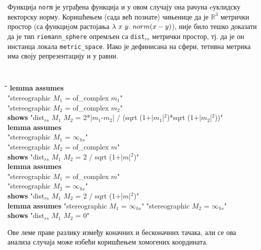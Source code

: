 Функција {\tt norm} је уграђена функција и у овом случају она рачуна
eуклидску векторску норму. Коришћењем (сада већ познате) чињенице да
је $\mathbb{R}^3$ метрички простор (са функциjом растојања
$\lambda\ x\ y.\ {\tt norm}(x - y)$), није било тешко доказати да је
тип {\tt riemann\_sphere} опремљен са {\tt dist$_{rs}$} метрички
простор, тј. да је он инстанца локала {\tt metric\_space}. Иако је
дефинисана на сфери, тетивна метрика има своју репрезентацију и у
равни.

{\tt
\begin{tabbing}
\hspace{2mm}\=\hspace{5mm}\=\hspace{5mm}\=\hspace{5mm}\=\hspace{5mm}\=\kill
\textbf{lemma} \textbf{assumes}\\
\>"stereographic $M_1$ = of\_complex $m_1$"\\
\>"stereographic $M_2$ = of\_complex $m_2$"\\
\>\textbf{shows} "dist$_{rs}$ $M_1$ $M_2$ = 2*|$m_1$-$m_2$| / (sqrt (1+|$m_1$|$^2$)*sqrt (1+|$m_2$|$^2$))"\\
\textbf{lemma} \textbf{assumes} \\
\>"stereographic $M_1$ = $\infty_{hs}$" \\
\>"stereographic $M_2$ = of\_complex $m$"\\
\>\textbf{shows} "dist$_{rs}$ $M_1$ $M_2$ = 2 / sqrt (1+|$m$|$^2$)"\\
\textbf{lemma} \textbf{assumes} \\
\>"stereographic $M_1$ = of\_complex $m$" \\
\>"stereographic $M_2$ = $\infty_{hs}$"\\
\>\textbf{shows} "dist$_{rs}$ $M_1$ $M_2$ = 2 / sqrt (1+|$m$|$^2$)"\\
\textbf{lemma} \textbf{assumes} "stereographic $M_1$ = $\infty_{hs}$" "stereographic $M_2$ = $\infty_{hs}$"\\
\>\textbf{shows} "dist$_{rs}$ $M_1$ $M_2$ = 0"
\end{tabbing}
}

Ове леме праве разлику између коначних и бесконачних тачака, али се
ова анализа случаја може избећи коришћењем хомогених координата.

